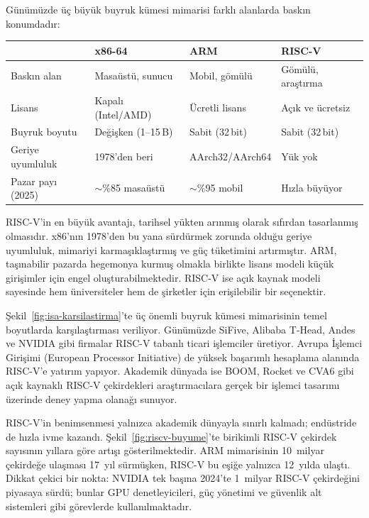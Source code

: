\begin{karsilastirma}
Günümüzde üç büyük buyruk kümesi mimarisi farklı alanlarda baskın konumdadır:

\begin{center}
\small
\begin{tabular}{lp{3cm}p{3cm}p{3cm}}
\toprule
 & \textbf{x86-64} & \textbf{ARM} & \textbf{RISC-V} \\
\midrule
Baskın alan & Masaüstü, sunucu & Mobil, gömülü & Gömülü, araştırma \\
Lisans & Kapalı (Intel/AMD) & Ücretli lisans & Açık ve ücretsiz \\
Buyruk boyutu & Değişken (1--15\,B) & Sabit (32\,bit) & Sabit (32\,bit) \\
Geriye uyumluluk & 1978'den beri & AArch32/AArch64 & Yük yok \\
Pazar payı (2025) & $\sim$\%85 masaüstü & $\sim$\%95 mobil & Hızla büyüyor \\
\bottomrule
\end{tabular}
\end{center}

RISC-V'in en büyük avantajı, tarihsel yükten arınmış olarak sıfırdan tasarlanmış olmasıdır. x86'nın 1978'den bu yana sürdürmek zorunda olduğu geriye uyumluluk, mimariyi karmaşıklaştırmış ve güç tüketimini artırmıştır. ARM, taşınabilir pazarda hegemonya kurmuş olmakla birlikte lisans modeli küçük girişimler için engel oluşturabilmektedir. RISC-V ise açık kaynak modeli sayesinde hem üniversiteler hem de şirketler için erişilebilir bir seçenektir.
\end{karsilastirma}

Şekil~\ref{fig:isa-karsilastirma}'te üç önemli buyruk kümesi mimarisinin temel boyutlarda karşılaştırması veriliyor. Günümüzde SiFive, Alibaba T-Head, Andes ve NVIDIA gibi firmalar RISC-V tabanlı ticari işlemciler üretiyor. Avrupa İşlemci Girişimi (European Processor Initiative) de yüksek başarımlı hesaplama alanında RISC-V'e yatırım yapıyor. Akademik dünyada ise BOOM, Rocket ve CVA6 gibi açık kaynaklı RISC-V çekirdekleri araştırmacılara gerçek bir işlemci tasarımı üzerinde deney yapma olanağı sunuyor.

RISC-V'in benimsenmesi yalnızca akademik dünyayla sınırlı kalmadı; endüstride de hızla ivme kazandı. Şekil~\ref{fig:riscv-buyume}'te birikimli RISC-V çekirdek sayısının yıllara göre artışı gösterilmektedir. ARM mimarisinin 10~milyar çekirdeğe ulaşması 17~yıl sürmüşken, RISC-V bu eşiğe yalnızca 12~yılda ulaştı. Dikkat çekici bir nokta: NVIDIA tek başına 2024'te 1~milyar RISC-V çekirdeğini piyasaya sürdü; bunlar GPU denetleyicileri, güç yönetimi ve güvenlik alt sistemleri gibi görevlerde kullanılmaktadır.

